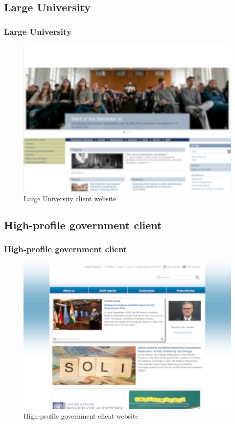 \documentclass[aspectratio=169]{beamer}
\begin{document}
\subsection{Large University}
\begin{frame}
  \frametitle{Large University}
  \begin{figure}
    \includegraphics[height=.7\textheight]{./img/003_-_large_university.png}
    \caption{Large University client website}
  \end{figure}
\end{frame}

\subsection{High-profile government client}
\begin{frame}
  \frametitle{High-profile government client}
  \begin{figure}
    \includegraphics[height=.7\textheight]{./img/004_-_government_client.jpg}
    \caption{High-profile government client website}
  \end{figure}
\end{frame}
\end{document}
